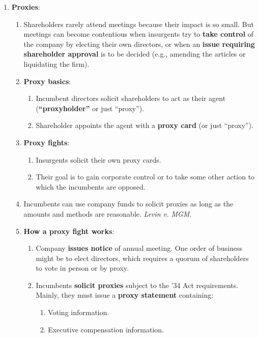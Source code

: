 \begin{enumerate}
    \item \textbf{Proxies}:
    \begin{enumerate}
        \item Shareholders rarely attend meetings because their impact is so 
        small. But meetings can become contentious when insurgents try to 
        \textbf{take control} of the company by electing their own directors, 
        or when an \textbf{issue requiring shareholder approval} is to be 
        decided (e.g., amending the articles or liquidating the firm).
        \item \textbf{Proxy basics}:
        \begin{enumerate}
            \item Incumbent directors solicit shareholders to act as their 
            agent (\textbf{``proxyholder''} or just ``proxy'').
            \item Shareholder appoints the agent with a \textbf{proxy card} 
            (or just ``proxy'').
        \end{enumerate}
        \item \textbf{Proxy fights}:
        \begin{enumerate}
            \item Insurgents solicit their own proxy cards.
            \item Their goal is to gain corporate control or to take some 
            other action to which the incumbents are opposed.
        \end{enumerate}
        \item Incumbents can use company funds to solicit proxies as long as 
        the amounts and methods are reasonable. \emph{Levin v. MGM}.
        \item \textbf{How a proxy fight works}:
        \begin{enumerate}
            \item Company \textbf{issues notice} of annual meeting. One order 
            of business might be to elect directors, which requires a quorum 
            of shareholders to vote in person or by proxy.
            \item Incumbents \textbf{solicit proxies} subject to the '34 Act 
            requirements. Mainly, they must issue a \textbf{proxy statement} 
            containing:
            \begin{enumerate}
                \item Voting information.
                \item Executive compensation information.

\end{enumerate}
\end{enumerate}
\end{enumerate}
\end{enumerate}
